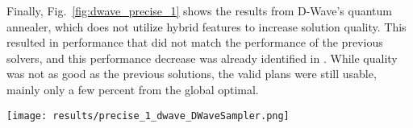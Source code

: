 Finally, Fig.~\ref{fig:dwave_precise_1} shows the results from D-Wave's quantum annealer, which does not utilize hybrid features to increase solution quality. This resulted in performance that did not match the performance of the previous solvers, and this performance decrease was already identified in \cite{Schonberger_Scherzinger_Mauerer}. While quality was not as good as the previous solutions, the valid plans were still usable, mainly only a few percent from the global optimal. %

\begin{figure*}[tbh]
    \centering
    \texttt{[image: results/precise\_1\_dwave\_DWaveSampler.png]}
    \caption{Precise 1 results using D-Wave's standard solver}
    \label{fig:dwave_precise_1}
\end{figure*}
